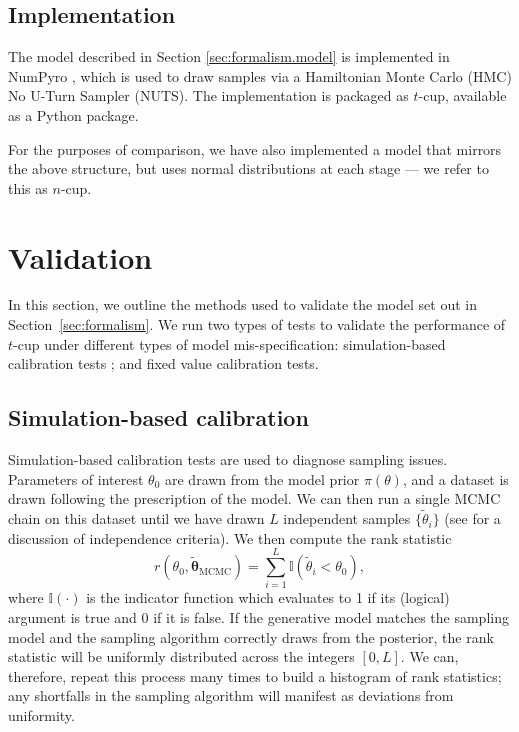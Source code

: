 \documentclass[fleqn,usenatbib]{rasti}
\begin{document}
\subsection{Implementation}
\label{sec:formalism.implementation}

The model described in Section \ref{sec:formalism.model} is implemented in
NumPyro \citep{NumPyro, Pyro}, which is used to draw samples via a Hamiltonian Monte Carlo (HMC) No U-Turn
Sampler (NUTS). The implementation is packaged as $t$-cup, available as a Python
package\footnotemark.

For the purposes of comparison, we have also implemented a model that mirrors
the above structure, but uses normal distributions at each stage --- we refer to this as $n$-cup.


\section{Validation}
\label{sec:methods}

In this section, we outline the methods used to validate the model set out in
Section~\ref{sec:formalism}. We run two types of tests to validate the performance of
$t$-cup under different types of model mis-specification: simulation-based
calibration tests \citep{Cook:2006, Talts:2018}; and fixed value calibration
tests.

\subsection{Simulation-based calibration}
\label{sec:methods.sbc}

Simulation-based calibration tests \citep{Cook:2006, Talts:2018} are used to
diagnose sampling issues. Parameters of interest $\theta_0$ are drawn from the
model prior $\pi(\theta)$, and a dataset is drawn following the prescription of
the model. We can then run a single MCMC chain on this dataset until we have
drawn $L$ independent samples $\{\tilde{\theta}_{i}\}$ (see \citet{Talts:2018}
for a discussion of independence criteria). We then compute the rank statistic
\begin{equation}
    r(\theta_0, \tilde{\boldsymbol{\theta}}_{\text{MCMC}})
        = \sum_{i = 1}^{L} \mathbb I (\tilde{\theta}_i < \theta_0),
\end{equation}
where $\mathbb{I}(\cdot)$ is the indicator function which evaluates to 1 if its (logical) argument is true and 0 if it is false.
If the generative model matches the sampling model and the sampling algorithm
correctly draws from the posterior, the rank statistic will be uniformly
distributed across the integers $[0, L]$. We can, therefore, repeat this process
many times to build a histogram of rank statistics; any shortfalls in the
sampling algorithm will manifest as deviations from uniformity.
\end{document}
